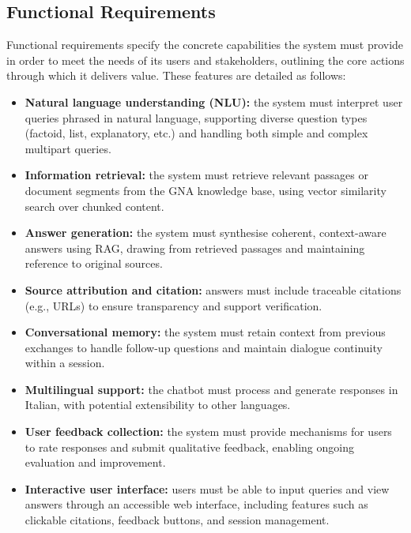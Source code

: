 \begin{spacing}{1.5}
\subsection{Functional Requirements}
Functional requirements specify the concrete capabilities the system must provide in order to meet the needs of its users and stakeholders, outlining the core actions through which it delivers value. These features are detailed as follows:
\begin{itemize}
    \item \textbf{Natural language understanding (NLU):} the system must interpret user queries phrased in natural language, supporting diverse question types (factoid, list, explanatory, etc.) and handling both simple and complex multipart queries.
    \item \textbf{Information retrieval:} the system must retrieve relevant passages or document segments from the GNA knowledge base, using vector similarity search over chunked content.
    \item \textbf{Answer generation:} the system must synthesise coherent, context-aware answers using RAG, drawing from retrieved passages and maintaining reference to original sources.
    \item \textbf{Source attribution and citation:} answers must include traceable citations (e.g., URLs) to ensure transparency and support verification.
    \item \textbf{Conversational memory:} the system must retain context from previous exchanges to handle follow-up questions and maintain dialogue continuity within a session.
    \item \textbf{Multilingual support:} the chatbot must process and generate responses in Italian, with potential extensibility to other languages.
    \item \textbf{User feedback collection:} the system must provide mechanisms for users to rate responses and submit qualitative feedback, enabling ongoing evaluation and improvement.
    \item \textbf{Interactive user interface:} users must be able to input queries and view answers through an accessible web interface, including features such as clickable citations, feedback buttons, and session management.
\end{itemize}


\end{spacing}
